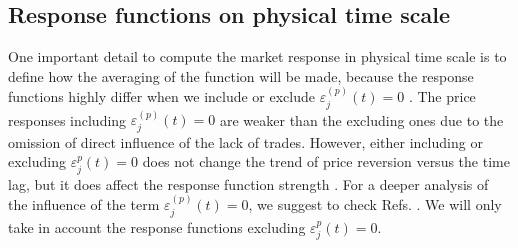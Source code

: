 \subsection{Response functions on physical time scale}
\label{subsec:response_function_physical}

One important detail to compute the market response in physical time scale is
to define how the averaging of the function will be made, because the
response functions highly differ when we include or exclude
$\varepsilon^{\left(p\right)}_j \left( t\right) = 0$ \cite{Wang_2016_cross}.
The price responses including
$\varepsilon^{\left(p\right)}_j \left( t\right) = 0$ are weaker than the
excluding ones due to the omission of direct influence of the lack of trades.
However, either including or excluding $\varepsilon^{p}_j \left( t\right) = 0$
does not change the trend of price reversion versus the time lag, but it does
affect the response function strength \cite{Wang_2016_avg}. For a deeper
analysis of the influence of the term
$\varepsilon^{\left(p\right)}_j \left( t\right) = 0$, we suggest to check Refs.
\cite{Wang_2016_avg,Wang_2016_cross}. We will only take in account the
response functions excluding $\varepsilon^{p}_j \left( t\right) = 0$.

